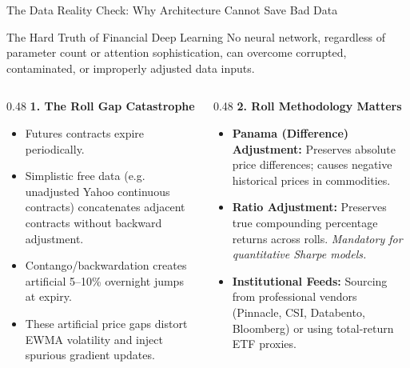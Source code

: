 \documentclass[10pt]{beamer}
\begin{document}
\begin{frame}{The Data Reality Check: Why Architecture Cannot Save Bad Data}
  \begin{alertblock}{The Hard Truth of Financial Deep Learning}
    No neural network, regardless of parameter count or attention sophistication, can overcome corrupted, contaminated, or improperly adjusted data inputs.
  \end{alertblock}
  \begin{columns}[t]
    \begin{column}{0.48\textwidth}
      \textbf{\scriptsize 1. The Roll Gap Catastrophe}
      \begin{itemize}\scriptsize
        \item Futures contracts expire periodically.
        \item Simplistic free data (e.g. unadjusted Yahoo continuous contracts) concatenates adjacent contracts without backward adjustment.
        \item Contango/backwardation creates artificial 5--10\% overnight jumps at expiry.
        \item These artificial price gaps distort EWMA volatility and inject spurious gradient updates.
      \end{itemize}
    \end{column}
    \begin{column}{0.48\textwidth}
      \textbf{\scriptsize 2. Roll Methodology Matters}
      \begin{itemize}\scriptsize
        \item \textbf{Panama (Difference) Adjustment:} Preserves absolute price differences; causes negative historical prices in commodities.
        \item \textbf{Ratio Adjustment:} Preserves true compounding percentage returns across rolls. \emph{Mandatory for quantitative Sharpe models.}
        \item \textbf{Institutional Feeds:} Sourcing from professional vendors (Pinnacle, CSI, Databento, Bloomberg) or using total-return ETF proxies.
      \end{itemize}
    \end{column}
  \end{columns}
\end{frame}
\end{document}
